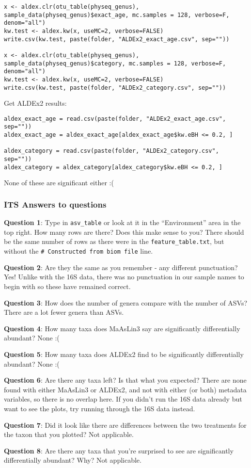 \documentclass[
]{book}
\begin{document}
\begin{verbatim}
x <- aldex.clr(otu_table(physeq_genus), sample_data(physeq_genus)$exact_age, mc.samples = 128, verbose=F, denom="all")
kw.test <- aldex.kw(x, useMC=2, verbose=FALSE)
write.csv(kw.test, paste(folder, "ALDEx2_exact_age.csv", sep=""))

x <- aldex.clr(otu_table(physeq_genus), sample_data(physeq_genus)$category, mc.samples = 128, verbose=F, denom="all")
kw.test <- aldex.kw(x, useMC=2, verbose=FALSE)
write.csv(kw.test, paste(folder, "ALDEx2_category.csv", sep=""))
\end{verbatim}

Get ALDEx2 results:

\begin{verbatim}
aldex_exact_age = read.csv(paste(folder, "ALDEx2_exact_age.csv", sep=""))
aldex_exact_age = aldex_exact_age[aldex_exact_age$kw.eBH <= 0.2, ]

aldex_category = read.csv(paste(folder, "ALDEx2_category.csv", sep=""))
aldex_category = aldex_category[aldex_category$kw.eBH <= 0.2, ]
\end{verbatim}

None of these are significant either :(

\subsubsection{ITS Answers to questions}\label{its-answers-to-questions}

\textbf{Question 1}: Type in \texttt{asv\_table} or look at it in the ``Environment'' area in the top right. How many rows are there? Does this make sense to you?
There should be the same number of rows as there were in the \texttt{feature\_table.txt}, but without the \texttt{\#\ Constructed\ from\ biom\ file} line.

\textbf{Question 2}: Are they the same as you remember - any different punctuation?
Yes! Unlike with the 16S data, there was no punctuation in our sample names to begin with so these have remained correct.

\textbf{Question 3}: How does the number of genera compare with the number of ASVs?
There are a lot fewer genera than ASVs.

\textbf{Question 4}: How many taxa does MaAsLin3 say are significantly differentially abundant?
None :(

\textbf{Question 5}: How many taxa does ALDEx2 find to be significantly differentially abundant?
None :(

\textbf{Question 6}: Are there any taxa left? Is that what you expected?
There are none found with either MaAsLin3 or ALDEx2, and not with either (or both) metadata variables, so there is no overlap here. If you didn't run the 16S data already but want to see the plots, try running through the 16S data instead.

\textbf{Question 7}: Did it look like there are differences between the two treatments for the taxon that you plotted?
Not applicable.

\textbf{Question 8}: Are there any taxa that you're surprised to see are significantly differentially abundant? Why?
Not applicable.

  
\end{document}
